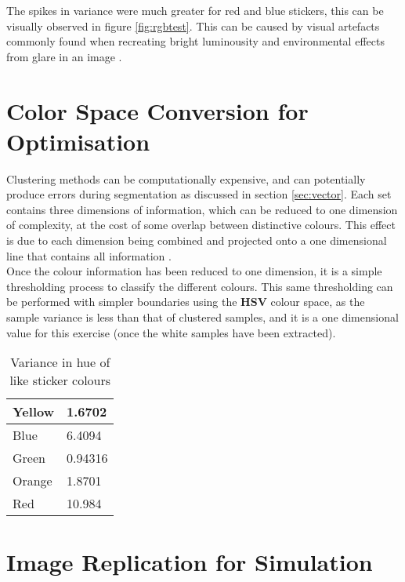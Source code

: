 The spikes in variance were much greater for red and blue stickers, this can be visually observed in figure \ref{fig:rgbtest}. This can be caused by visual artefacts commonly found when recreating bright luminousity and environmental effects from glare in an image \cite{mccann2007camera}. 

\section{Color Space Conversion for Optimisation}
Clustering methods can be computationally expensive, and can potentially produce errors during segmentation as discussed in section \ref{sec:vector}. Each set contains three dimensions of information, which can be reduced to one dimension of complexity, at the cost of some overlap between distinctive colours. This effect is due to each dimension being combined and projected onto a one dimensional line that contains all information \cite{celenk1991colour}.\\

Once the colour information has been reduced to one dimension, it is a simple thresholding process to classify the different colours. This same thresholding can be performed with simpler boundaries using the \textbf{HSV} colour space, as the sample variance is less than that of clustered samples, and it is a one dimensional value for this exercise (once the white samples have been extracted).\\

\begin{table}[h]
  \centering
  \begin{tabular}{|l|l|}
    \hline
    Yellow & 1.6702 \\ \hline
    Blue & 6.4094 \\ \hline
    Green & 0.94316 \\ \hline
    Orange & 1.8701 \\ \hline
    Red & 10.984 \\ \hline
  \end{tabular}
  \caption{Variance in hue of like sticker colours}
  \label{tab:hue_var}
\end{table}

\section{Image Replication for Simulation}

